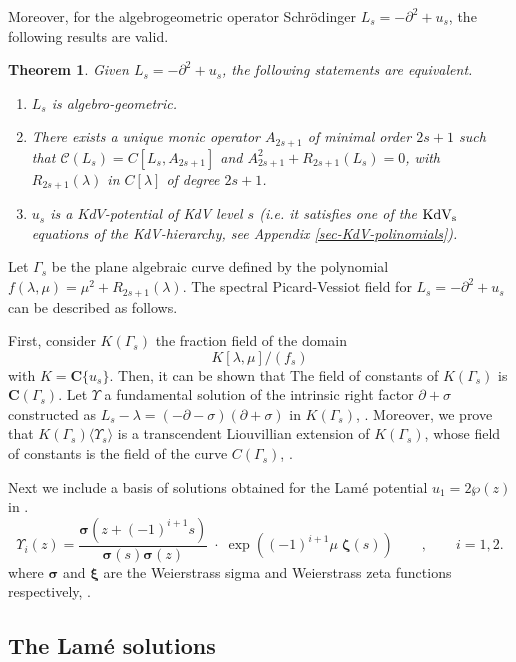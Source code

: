 \documentclass[a4paper,12pt]{article}
\newcommand{\cC}{\mathcal{C}}
\newcommand{\coC}{\mathbf{C}}
\def\KdV{\rm KdV}
\def\KdV{\rm KdV}
\newtheorem{thm}{Theorem}[section]
\begin{document}
Moreover, for the algebrogeometric operator Schr\"odinger $L_s = -\partial^2+u_s$, the following results are valid.
\begin{thm}
 Given $L_s = -\partial^2+u_s$, the following statements are equivalent.
\begin{enumerate}
    \item {\it $L_s$ is algebro-geometric.}
    \item {\it There exists a unique monic operator $A_{2s+1}$ of minimal order $2s+1$  such that $\cC(L_s)=C[L_s,A_{2s+1}]$ and $A^2_{2s+1}+R_{2s+1}(L_s)=0$, with $R_{2s+1}(\lambda)$ in $C[\lambda]$ of degree $2s+1$.}
    \item {\it $u_s$ is a $KdV$-potential of KdV level $s$ (i.e. it satisfies one of the $\KdV_s$ equations of the KdV-hierarchy, see Appendix \ref{sec-KdV-polinomials}).}
\end{enumerate}  
\end{thm}
Let $\Gamma_s$ be the plane algebraic curve defined by the polynomial $f(\lambda, \mu) = \mu^2 +R_{2s+1} (\lambda )$. The spectral  Picard-Vessiot field for $L_s = -\partial^2+u_s$ can be described as follows.

First, consider $K(\Gamma_s )$ the fraction field of the domain
\[
K[\lambda ,\mu ] /(f_s )
\]
with $K=\coC\{ u_s \}$. Then, it can be shown that  The field of constants of $K(\Gamma_s )$ is $\coC(\Gamma_s )$. Let $\Upsilon$ a fundamental solution of the intrinsic right factor $\partial+\sigma$ constructed as $L_s -\lambda = (-\partial-\sigma )(\partial+\sigma )$ in $K(\Gamma_s )$, \cite{MRZ1}. Moreover, we prove that $K(\Gamma_s)\langle \Upsilon_s\rangle$ is a transcendent Liouvillian extension  of $K(\Gamma_s)$, whose field of constants is the field of the curve $C(\Gamma_s)$, \cite{MRZ2}.

Next we include a basis of solutions obtained for the Lam\'e potential $u_1 = 2\wp(z)$ in \cite{MRZ2}.
\[
 \Upsilon_i (z)= \frac{{\bm \sigma}(z+(-1)^{i+1} s )}{{\bm \sigma}(s ){\bm \sigma}(z)}\; \cdot \;\exp\left((-1)^{i+1} \mu\;\bm\zeta(s)\right) \qquad , \qquad i=1,2.
\]
where $\bm \sigma$ and $\bm \xi$ are the Weierstrass sigma and Weierstrass zeta functions respectively, \cite{WW}.



\subsection{The Lam\'e solutions}\label{sec-A}  
\end{document}
